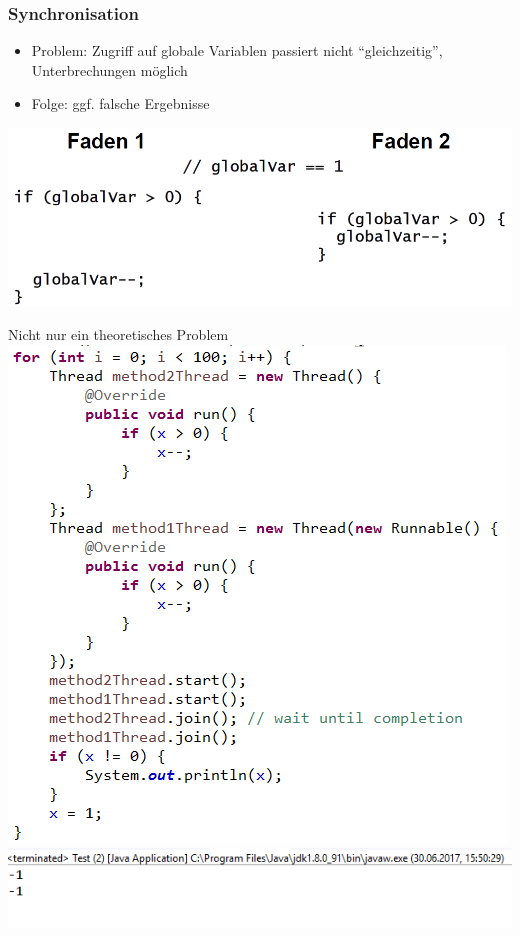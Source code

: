 \documentclass[18pt]{beamer}
\begin{document}
	\begin{frame}
		\frametitle{Synchronisation}
		\begin{itemize}
			\item Problem: Zugriff auf globale Variablen passiert nicht \enquote{gleichzeitig}, Unterbrechungen möglich
			\item Folge: ggf. falsche Ergebnisse
		\end{itemize}
		\includegraphics[scale=0.43]{./pics/tut5/par-pro.png}
	\end{frame}

	\begin{frame}{Nicht nur ein theoretisches Problem}
		\centering
		\includegraphics[scale=0.43]{./pics/tut5/synch-ex.png} \pause
		\includegraphics[scale=0.43]{./pics/tut5/synch-ex2.png}
	\end{frame}
\end{document}
